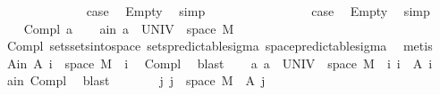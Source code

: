 \begin{isabellebody}
\isanewline
\ \ \ \ \isamarkupfalse%
\ {}\isanewline
\ \ \ \ \isamarkupfalse%
\ \isamarkupfalse%
\ {\isacharquery}{\kern0pt}case\ \isamarkupfalse%
\ Empty\ \isamarkupfalse%
\ simp\isanewline
\ \ \isamarkupfalse%
\isanewline
\ \ \ \ \isamarkupfalse%
\ {}\isanewline
\ \ \ \ \isamarkupfalse%
\ \isamarkupfalse%
\ {\isacharquery}{\kern0pt}case\ \isamarkupfalse%
\ Empty\ \isamarkupfalse%
\ simp\isanewline
\ \ \isacommand{{\isacharbraceright}{\kern0pt}}\isamarkupfalse%
\isanewline
{}\isamarkupfalse%
\isanewline
\ \ \isamarkupfalse%
\ {\isacharparenleft}{\kern0pt}Compl\ a{\isacharparenright}{\kern0pt}\isanewline
\ \ \isamarkupfalse%
\ a{\isacharunderscore}{\kern0pt}in{\isacharcolon}{\kern0pt}\ {\isachardoublequoteopen}a\ {\isasymsubseteq}\ UNIV\ {\isasymtimes}\ space\ M{\isachardoublequoteclose}\ \isamarkupfalse%
\ Compl{\isacharparenleft}{\kern0pt}{}{\isacharparenright}{\kern0pt}\ sets{\isachardot}{\kern0pt}sets{\isacharunderscore}{\kern0pt}into{\isacharunderscore}{\kern0pt}space\ sets{\isacharunderscore}{\kern0pt}predictable{\isacharunderscore}{\kern0pt}sigma\ space{\isacharunderscore}{\kern0pt}predictable{\isacharunderscore}{\kern0pt}sigma\ \isamarkupfalse%
\ metis\isanewline
\ \ \isamarkupfalse%
\ A{\isacharunderscore}{\kern0pt}in{\isacharcolon}{\kern0pt}\ {\isachardoublequoteopen}A\ i\ {\isasymsubseteq}\ space\ M{\isachardoublequoteclose}\ \ i\ \isamarkupfalse%
\ Compl{\isacharparenleft}{\kern0pt}{}{\isacharparenright}{\kern0pt}\ \isamarkupfalse%
\ blast\isanewline
\ \ \isamarkupfalse%
\ a{\isacharcolon}{\kern0pt}\ {\isachardoublequoteopen}a\ {\isacharequal}{\kern0pt}\ UNIV\ {\isasymtimes}\ space\ M\ {\isacharminus}{\kern0pt}\ {\isacharparenleft}{\kern0pt}{\isasymUnion}i{\isachardot}{\kern0pt}\ {\isacharbraceleft}{\kern0pt}i{\isacharbraceright}{\kern0pt}\ {\isasymtimes}\ A\ i{\isacharparenright}{\kern0pt}{\isachardoublequoteclose}\ \isamarkupfalse%
\ a{\isacharunderscore}{\kern0pt}in\ Compl{\isacharparenleft}{\kern0pt}{}{\isacharparenright}{\kern0pt}\ \isamarkupfalse%
\ blast\isanewline
\ \ \isamarkupfalse%
\ \isamarkupfalse%
\ {\isachardoublequoteopen}{\isachardot}{\kern0pt}{\isachardot}{\kern0pt}{\isachardot}{\kern0pt}\ {\isacharequal}{\kern0pt}\ {\isacharparenleft}{\kern0pt}{\isasymUnion}j{\isachardot}{\kern0pt}\ {\isacharbraceleft}{\kern0pt}j{\isacharbraceright}{\kern0pt}\ {\isasymtimes}\ {\isacharparenleft}{\kern0pt}space\ M\ {\isacharminus}{\kern0pt}\ A\ j{\isacharparenright}{\kern0pt}{\isacharparenright}{\kern0pt}{\isachardoublequoteclose}\ \isamarkupfalse%

\end{isabellebody}
